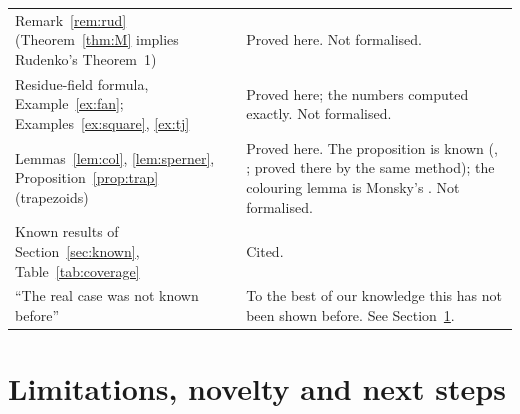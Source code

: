 \documentclass[11pt]{article}
\theoremstyle{definition}
\begin{document}
{\begin{longtable}{@{}>{\raggedright\arraybackslash}p{5.2cm}>{\raggedright\arraybackslash}p{9.8cm}@{}}
Remark~\ref{rem:rud} (Theorem~\ref{thm:M} implies Rudenko's Theorem~1) & Proved here. Not formalised.\\
Residue-field formula, Example~\ref{ex:fan}; Examples~\ref{ex:square}, \ref{ex:tj} & Proved here; the numbers computed exactly. Not formalised.\\
Lemmas~\ref{lem:col}, \ref{lem:sperner}, Proposition~\ref{prop:trap} (trapezoids) & Proved here. The proposition is known (\cite[Theorem 3.2]{KS}, \cite[p.~122]{SS}; proved there by the same method); the colouring lemma is Monsky's \cite[p.~163]{Mon70}. Not formalised.\\
Known results of Section~\ref{sec:known}, Table~\ref{tab:coverage} & Cited.\\
``The real case was not known before'' & To the best of our knowledge this has not been shown before. See Section~\ref{sec:limits}.\\
\end{longtable}}

\section{Limitations, novelty and next steps}\label{sec:limits}
\end{document}
